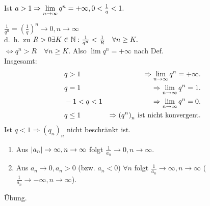 \documentclass[../ana1.tex]{subfiles}
\begin{document}
\begin{bsp}
	Ist \(a>1 \Rightarrow \lim\limits_{n\rightarrow\infty}q^n = +\infty, 0< \frac{1}{q} < 1. \)
\end{bsp}
\begin{bew}
	\( \frac{1}{q^n} = {\left( \frac{1}{q} \right)}^n \rightarrow 0, n\rightarrow \infty \) \\
	d.\ h.\ zu \(R>0 \exists K\in\mathbb{N}: \frac{1}{q^n} < \frac{1}{R} \quad \forall n\geq K. \) \\
	\( \Leftrightarrow q^n > R \quad \forall n\geq K. \) Also \(\lim q^n = +\infty \) nach Def.\\
	Insgesamt:
	\begin{align*}
		&q>1 &\Rightarrow \lim\limits_{n\rightarrow\infty}q^n = +\infty.\\
		&q=1 &\Rightarrow \lim\limits_{n\rightarrow\infty}q^n = 1.\\
		&-1<q<1 & \Rightarrow \lim\limits_{n\rightarrow\infty} q^n = 0.\\
		&q\leq 1 & \Rightarrow {(q^n)}_n \text{ ist nicht konvergent.}
	\end{align*}
	Ist \( q<1 \Rightarrow {(q_n)}_n \) nicht beschränkt ist.
\end{bew}

\begin{satz}[Kehrwerte]
	\begin{enumerate}
		\item Aus \( \left|a_n\right| \rightarrow \infty, n\rightarrow\infty \) folgt \(\frac{1}{a_n} \rightarrow0,n\rightarrow\infty \).
		\item Aus \( a_n\rightarrow 0, a_n > 0 \) (bzw. \(a_n<0 \)) \( \forall n \) folgt \( \frac{1}{a_n} \rightarrow\infty, n\rightarrow\infty \) (\( \frac{1}{a_n} \rightarrow -\infty, n\rightarrow\infty \)).
	\end{enumerate}
\end{satz}
\begin{bew}\phantom{\qedhere}
	Übung.
\end{bew}
\end{document}
